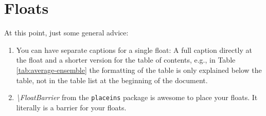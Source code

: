 \section{Floats}
\label{sec:floats}
At this point, just some general advice:
\begin{enumerate}
	\item You can have separate captions for a single float: A full caption directly at the float and a shorter version for the table of contents, e.g., in Table \ref{tab:average-ensemble} the formatting of the table is only explained below the table, not in the table list at the beginning of the document.
	\item \textit{\textbackslash FloatBarrier} from the \texttt{placeins} package is awesome to place your floats. It literally is a barrier for your floats.
\end{enumerate}

